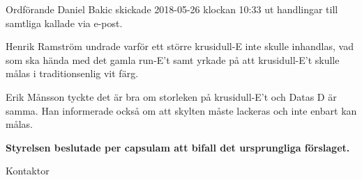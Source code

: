 \documentclass[10pt]{article}
\begin{document}
        Ordförande Daniel Bakic skickade 2018-05-26 klockan 10:33 ut handlingar till samtliga kallade via e-post.

        Henrik Ramström undrade varför ett större krusidull-E inte skulle inhandlas, vad som ska hända med det gamla run-E't samt yrkade på att krusidull-E't skulle målas i traditionsenlig vit färg. 

        Erik Månsson tyckte det är bra om storleken på krusidull-E't och Datas D är samma. Han informerade också om att skylten måste lackeras och inte enbart kan målas. 

        \textbf{Styrelsen beslutade per capsulam att bifall det ursprungliga förslaget.}

        \begin{signatures}{1}
        \signature{Axel Voss}{Kontaktor}
        \end{signatures}
    
\end{document}
